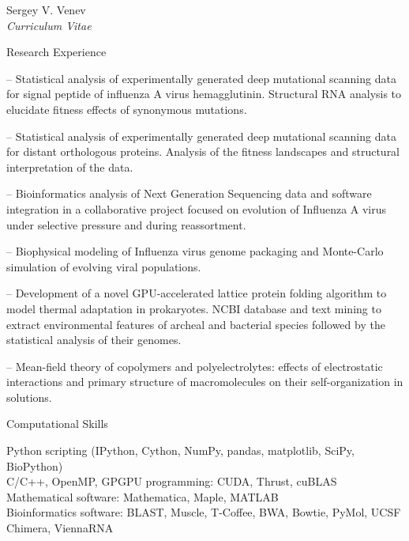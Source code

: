 \documentclass[10pt]{article}
\newenvironment{sublist}{%
    \begin{list}{}{%
        \setlength{\itemsep}{0em}\setlength{\parsep}{0em}%
        \setlength{\topsep}{0em}\setlength{\parskip}{0em}%
    }%
}%
{ \end{list} }
\begin{document}
\begin{cv}{Sergey V. Venev\\{\large \itshape Curriculum Vitae}}
\setlength{\oldcvlabelwidth}{\cvlabelwidth}
\setlength{\cvlabelwidth}{1em}
\begin{cvlist}{Research Experience}
    \item[--] Statistical analysis of experimentally generated deep mutational scanning data for signal peptide of influenza A virus hemagglutinin. Structural RNA analysis to elucidate fitness effects of synonymous mutations.
    \item[--] Statistical analysis of experimentally generated deep mutational scanning data for distant orthologous proteins. Analysis of the fitness landscapes and structural interpretation of the data.
    \item[--] Bioinformatics analysis of Next Generation Sequencing data and software integration in a collaborative project focused on evolution of Influenza A virus under selective pressure and during reassortment.
    \item[--] Biophysical modeling of Influenza virus genome packaging and Monte-Carlo simulation of evolving viral populations.
    \item[--] Development of a novel GPU-accelerated lattice protein folding algorithm to model thermal adaptation in prokaryotes. NCBI database and text mining to extract environmental features of archeal and bacterial species followed by the statistical analysis of their genomes.
    \item[--] Mean-field theory of copolymers and polyelectrolytes: effects of electrostatic interactions and primary structure of macromolecules on their self-organization in solutions.

\end{cvlist}
\setlength{\cvlabelwidth}{\oldcvlabelwidth}



\setlength{\oldcvlabelwidth}{\cvlabelwidth}
\setlength{\cvlabelwidth}{1em}
\begin{cvlist}{Computational Skills}
        \item Python scripting (IPython, Cython, NumPy, pandas, matplotlib, SciPy, BioPython)\\
        C/C++, OpenMP, GPGPU programming: CUDA, Thrust, cuBLAS\\
        Mathematical software: Mathematica, Maple, MATLAB\\
        Bioinformatics software: BLAST, Muscle, T-Coffee, BWA, Bowtie, PyMol, UCSF Chimera, ViennaRNA
\end{cvlist}
\setlength{\cvlabelwidth}{\oldcvlabelwidth}





\end{cv}
\end{document}

